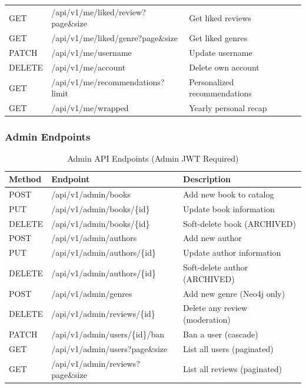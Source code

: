 \begin{table}[H]
\begin{tabular}{@{}p{}p{}p{}@{}}
        GET & /api/v1/me/liked/review?page\&size & Get liked reviews \\
        GET & /api/v1/me/liked/genre?page\&size & Get liked genres \\
        PATCH & /api/v1/me/username & Update username \\
        DELETE & /api/v1/me/account & Delete own account \\
        GET & /api/v1/me/recommendations?limit & Personalized recommendations \\
        GET & /api/v1/me/wrapped & Yearly personal recap \\
        \bottomrule
    \end{tabular}
\end{table}

\subsubsection{Admin Endpoints}
\begin{table}[H]
    \centering
    \caption{Admin API Endpoints (Admin JWT Required)}
    \label{tab:admin_endpoints}
    \begin{tabular}{@{}p{}p{}p{}@{}}
        \toprule
        \textbf{Method} & \textbf{Endpoint} & \textbf{Description} \\ \midrule
        POST & /api/v1/admin/books & Add new book to catalog \\
        PUT & /api/v1/admin/books/\{id\} & Update book information \\
        DELETE & /api/v1/admin/books/\{id\} & Soft-delete book (ARCHIVED) \\
        POST & /api/v1/admin/authors & Add new author \\
        PUT & /api/v1/admin/authors/\{id\} & Update author information \\
        DELETE & /api/v1/admin/authors/\{id\} & Soft-delete author (ARCHIVED) \\
        POST & /api/v1/admin/genres & Add new genre (Neo4j only) \\
        DELETE & /api/v1/admin/reviews/\{id\} & Delete any review (moderation) \\
        PATCH & /api/v1/admin/users/\{id\}/ban & Ban a user (cascade) \\
        GET & /api/v1/admin/users?page\&size & List all users (paginated) \\
        GET & /api/v1/admin/reviews?page\&size & List all reviews (paginated) \\
        \bottomrule
    \end{tabular}
\end{table}


